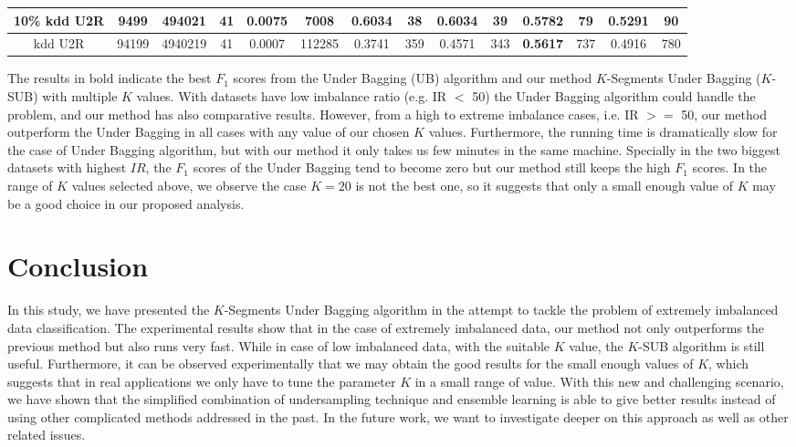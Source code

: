 \begin{table*}[]
{\begin{tabular}{|c|c|c|c|c|c|c|c|c|c|c|c|c|c|}
10\% kdd U2R             & 9499                & 494021                  & 41                       & 0.0075          & 7008   & \textbf{0.6034}   & 38     & \textbf{0.6034}   & 39     & 0.5782             & 79     & 0.5291        & 90          \\ \hline
kdd U2R                  & 94199               & 4940219                 & 41                       & 0.0007          & 112285 & 0.3741            & 359    & 0.4571            & 343    & \textbf{0.5617}    & 737    & 0.4916        & 780         \\ \hline
\end{tabular}%
}
\end{table*}


The results in bold indicate the best $F_1$ scores from the Under Bagging (UB) algorithm and our method $K$-Segments Under Bagging ($K$-SUB) with multiple $K$ values. With datasets have low imbalance ratio (e.g. IR $<$ 50) the Under Bagging algorithm could handle the problem, and our method has also comparative results. However, from a high to extreme imbalance cases, i.e. IR $>=$ 50, our method outperform the Under Bagging in all cases with any value of our chosen $K$ values. Furthermore, the running time is dramatically slow for the case of Under Bagging algorithm, but with our method it only takes us few minutes in the same machine. Specially in the two biggest datasets with highest $IR$, the $F_1$ scores of the Under Bagging tend to become zero but our method still keeps the high $F_1$ scores. In the range of $K$ values selected above, we observe the case $K = 20$ is not the best one, so it suggests that only a small enough value of $K$ may be a good choice in our proposed analysis.


\section{Conclusion}

In this study, we have presented the $K$-Segments Under Bagging algorithm in the attempt to tackle the problem of extremely imbalanced data classification. The experimental results show that in the case of extremely imbalanced data, our method not only outperforms the previous method but also runs very fast. While in case of low imbalanced data, with the suitable $K$ value, the $K$-SUB algorithm is still useful. Furthermore, it can be observed experimentally that we may obtain the good results for the small enough values of $K$, which suggests that in real applications we only have to tune the parameter $K$ in a small range of value. With this new and challenging scenario, we have shown that the simplified combination of undersampling technique and ensemble learning is able to give better results instead of using other complicated methods addressed in the past. In the future work, we want to investigate deeper on this approach as well as other related issues.
